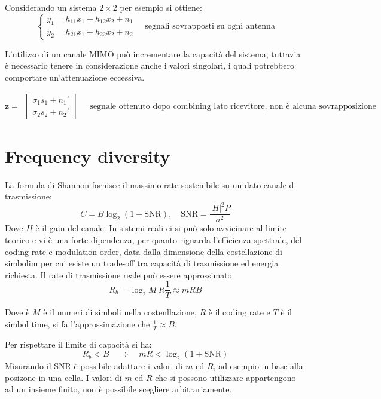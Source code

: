 Considerando un sistema $2 \times 2$ per esempio si ottiene:
\[
    \begin{cases*}
        y_1 = h_{11} x_1 + h_{12} x_2 + n_1 \\
        y_2 = h_{21} x_1 + h_{22} x_2 + n_2
    \end{cases*}
    \quad
    \text{segnali sovrapposti su ogni antenna}
\]

L'utilizzo di un canale MIMO può incrementare la capacità del sistema, tuttavia è necessario tenere in considerazione anche i valori singolari, i quali potrebbero comportare un'attenuazione eccessiva.


\[
    \mathbf{z} = \begin{matrix}
        \begin{bmatrix}
            \sigma_1 s_1 + n_1' \\
            \sigma_2 s_2 + n_2'
        \end{bmatrix}
    \end{matrix}
    \quad 
    \text{segnale ottenuto dopo combining lato ricevitore, non è alcuna sovrapposizione}
\]

\section*{Frequency diversity}

La formula di Shannon fornisce il massimo rate sostenibile su un dato canale di trasmissione:
\[
    C = B \log_2 \left( 1 + \text{SNR} \right), \quad \text{SNR} = \frac{\left| H \right|^2 P}{\sigma^2}
\]
Dove $H$ è il gain del canale.
In sistemi reali ci si può solo avvicinare al limite teorico e vi è una forte dipendenza, per quanto riguarda l'efficienza spettrale, del coding rate e modulation order, data dalla dimensione della costellazione di simbolim per cui esiste un trade-off tra capacità di trasmissione ed energia richiesta. Il rate di trasmissione reale può essere approssimato:
\[
    R_b = \log_2 M \  R \frac{1}{T}  \approx m R B
\]

Dove è $M$ è il numeri di simboli nella costenllazione, $R$ è il coding rate e $T$ è il simbol time, si fa l'approssimazione che $\frac{1}{T} \approx B$. 


Per rispettare il limite di capacità si ha:
\[
    R_b < B \quad \Rightarrow \quad mR < \log_2 (1 + \text{SNR})
\] 
Misurando il SNR è possibile adattare i valori di $m$ ed $R$, ad esempio in base alla posizone in una cella.
I valori di $m$ ed $R$ che si possono utilizzare appartengono ad un insieme finito, non è possibile scegliere arbitrariamente.

